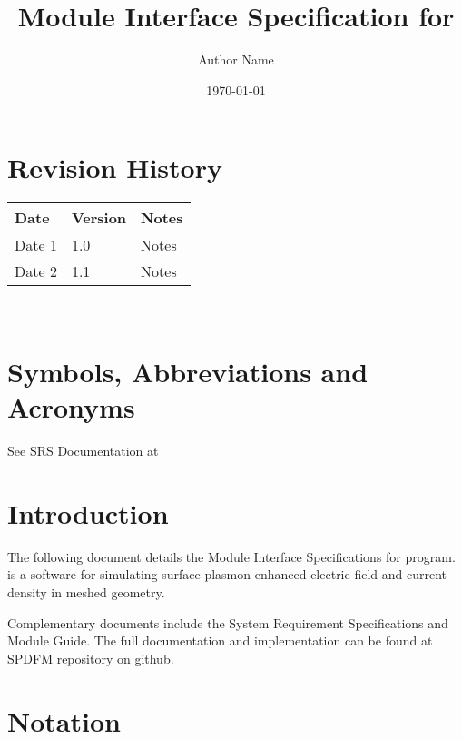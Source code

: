 \documentclass[12pt, titlepage]{article}
\begin{document}
\title{Module Interface Specification for \progname{}}

\author{Author Name}

\date{\today}

\maketitle


\section{Revision History}

\begin{tabularx}{\textwidth}{p{3cm}p{2cm}X}
\toprule {\bf Date} & {\bf Version} & {\bf Notes}\\
\midrule
Date 1 & 1.0 & Notes\\
Date 2 & 1.1 & Notes\\
\bottomrule
\end{tabularx}

~\newpage

\section{Symbols, Abbreviations and Acronyms}

See SRS Documentation at 


\newpage

\tableofcontents

\newpage


\section{Introduction}

The following document details the Module Interface Specifications for \progname{} program. \progname{} is a software for simulating surface plasmon enhanced electric field and current density in meshed geometry. 

Complementary documents include the System Requirement Specifications
and Module Guide.  The full documentation and implementation can be
found at \href{https://github.com/shmouses/SPDFM}{SPDFM repository} on github.  

\section{Notation}
\end{document}
